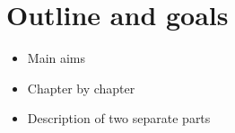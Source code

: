 \section{Outline and goals}
\label{sec:goals-intro}
\begin{itemize}
 \item Main aims
 \item Chapter by chapter
 \item Description of two separate parts
\end{itemize}

